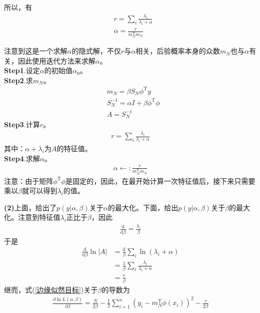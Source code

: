         所以，有
        \begin{align*}
        &r = \sum_i \frac{\lambda_i}{\lambda_i+\alpha} \\
        &\alpha = \frac{r}{m_N^\mathrm{T}m_N}
        \end{align*}
        \par
        注意到这是一个求解$\alpha$的隐式解，不仅$r$与$\alpha$相关，后验概率本身的众数$m_N$也与$\alpha$有关，因此使用迭代方法来求解$\alpha$。\\
        \textbf{Step1}.设定$\alpha$的初始值$\alpha_0$。\\
        \textbf{Step2}.求$m_N$。
        \begin{align*}
        &m_N = \beta S_N\phi^\mathrm{T}y \\
        &S_N^{-1} = \alpha I + \beta \phi^\mathrm{T}\phi \\
        &A = S_N^{-1}
        \end{align*}
        \textbf{Step3}.计算$r$。
        \begin{align*}
        r = \sum_i \frac{\lambda_i}{\lambda_i + \alpha}
        \end{align*}
        其中：$\alpha+\lambda_i$为$A$的特征值。\\
        \textbf{Step4}.求解$\alpha$。
        \begin{align*}
        \alpha \leftarrow : \frac{r}{m_N^\mathrm{T}m_N}
        \end{align*}
        注意：由于矩阵$\phi^\mathrm{T}\phi$是固定的，因此，在最开始计算一次特征值后，接下来只需要乘以$\beta$就可以得到$\lambda_i$的值。
        \par
        \textbf{(2)}上面，给出了$p(y|\alpha,\beta)$关于$\alpha$的最大化。下面，给出$p(y|\alpha,\beta)$关于$\beta$的最大化。注意到特征值$\lambda_i$正比于$\beta$，因此
        \begin{align*}
        \frac{\mathrm{d}}{\mathrm{d}\beta} = \frac{\lambda_i}{\beta}
        \end{align*}
        于是
        \begin{align*}
        \frac{\mathrm{d}}{\mathrm{d}\beta} \ln |A| &= \frac{\mathrm{d}}{\beta} \sum_i \ln (\lambda_i + \alpha) \\
         &= \frac{1}{\beta} \sum_i \frac{\lambda_i}{\lambda_i+\alpha} \\
         &= \frac{r}{\beta}
        \end{align*}
        继而，式(\ref{边缘似然目标})关于$\beta$的导数为
        \begin{align*}
        \frac{\partial \ln L(\alpha,\beta)}{\partial \beta} = \frac{N}{2\beta} - \frac{1}{2} \sum_{i=1}^n \left( y_i - m_N^\mathrm{T}\phi(x_i) \right) ^2 - \frac{r}{2\beta}
        \end{align*}
